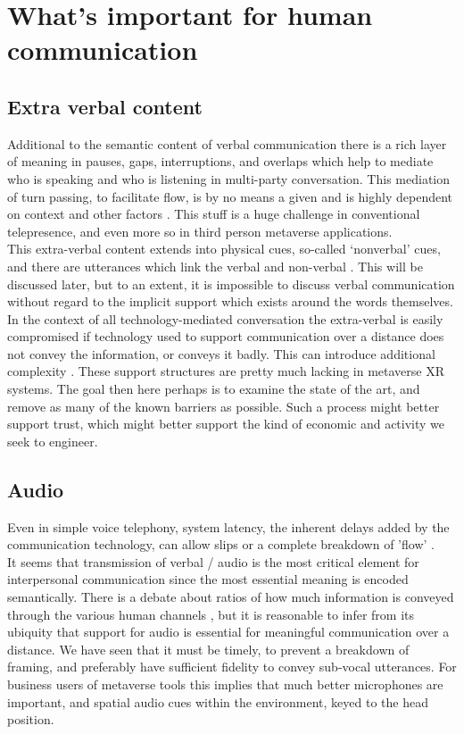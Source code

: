 \section{What's important for human communication}
\subsection{Extra verbal content}
Additional to the semantic content of verbal communication there is a rich layer of meaning in pauses, gaps, interruptions, and overlaps \cite{Heldner2010} which help to mediate who is speaking and who is listening in multi-party conversation. This mediation of turn passing, to facilitate flow, is by no means a given and is highly dependent on context and other factors \cite{Kleinke1986a}. This stuff is a huge challenge in conventional telepresence, and even more so in third person metaverse applications. \\ 
This extra-verbal content \cite{ting2012understanding} extends into physical cues, so-called `nonverbal' cues, and there are utterances which link the verbal and non-verbal \cite{Otsuka2005}. This will be discussed later, but to an extent, it is impossible to discuss verbal communication without regard to the implicit support which exists around the words themselves. \\
In the context of all technology-mediated conversation the extra-verbal is easily compromised if technology used to support communication over a distance does not convey the information, or conveys it badly. This can introduce additional complexity \cite{Otsuka2005}. These support structures are pretty much lacking in metaverse XR systems. The goal then here perhaps is to examine the state of the art, and remove as many of the known barriers as possible. Such a process might better support trust, which might better support the kind of economic and activity we seek to engineer.\\
\subsection{Audio}
Even in simple voice telephony, system latency, the inherent delays added by the communication technology, can allow slips or a complete breakdown of 'flow' \cite{Katagiri2007}.\\
It seems that transmission of verbal / audio is the most critical element for interpersonal communication since the most essential meaning is encoded semantically. There is a debate about ratios of how much information is conveyed through the various human channels \cite{loomis2012sensory}, but it is reasonable to infer from its ubiquity that support for audio is essential for meaningful communication over a distance. We have seen that it must be timely, to prevent a breakdown of framing, and preferably have sufficient fidelity to convey sub-vocal utterances. For business users of metaverse tools this implies that much better microphones are important, and spatial audio cues within the environment, keyed to the head position. \\

